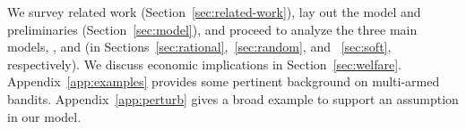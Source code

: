 We survey related work (Section~\ref{sec:related-work}), lay out the model and preliminaries (Section~\ref{sec:model}), and proceed to analyze the three main models, \HardMax, \HardMaxRandom and \SoftMaxRandom (in Sections~\ref{sec:rational},~\ref{sec:random}, and ~\ref{sec:soft}, respectively). We discuss economic implications in Section~\ref{sec:welfare}. Appendix~\ref{app:examples} provides some pertinent background on multi-armed bandits. Appendix~\ref{app:perturb} gives a broad example to support an  assumption in our model.




